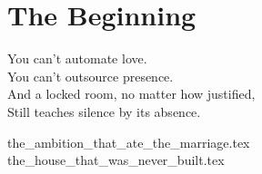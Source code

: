 \part{The Beginning}

\vfill

\begin{flushright}
\Large
You can’t automate love.\\
You can’t outsource presence.\\
And a locked room, no matter how justified,\\
Still teaches silence by its absence.
\end{flushright}

{the_ambition_that_ate_the_marriage.tex}
{the_house_that_was_never_built.tex}


